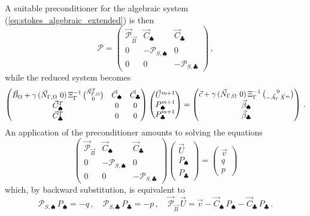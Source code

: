 A suitable preconditioner for the algebraic system
(\ref{eq:stokes_algebraic_extended}) is then
\begin{equation} \label{eq:ESW_extended}
\mathcal{P} = \begin{pmatrix}
\vec{\mathcal{P}}_{\vec B} & \vec C_\spadesuit & \vec C_\clubsuit \\
0 & -\mathcal{P}_{S,\spadesuit} & 0 \\
0 & 0 &-\mathcal{P}_{S,\clubsuit}
\end{pmatrix}\,,
\end{equation}
while the reduced system becomes
\begin{subequations}
\begin{equation} \label{eq:SchurkX_extended}
\begin{pmatrix}
\vec B_\Omega + \gamma\,(\Nbulk \ 0)\,\Xi_\Gamma^{-1}\,\binom{\NbulkT}{0} &
\vec C_\spadesuit & \vec C_\clubsuit \\
\vec C^T_\spadesuit & 0 & 0 \\
\vec C^T_\clubsuit & 0 & 0 \\
\end{pmatrix}
\begin{pmatrix}
\vec U^{m+1} \\
P^{m+1}_\spadesuit \\
P^{m+1}_\clubsuit
\end{pmatrix}
= \begin{pmatrix}
\vec c+\gamma\,(\Nbulk \ 0)\,
\Xi_\Gamma^{-1}\,\binom{0}{-\vec A_\Gamma\,\vec X^m} \\
\vec \beta_\spadesuit \\
\vec \beta_\clubsuit
\end{pmatrix}\,.
\end{equation}
\end{subequations}
An application of the preconditioner amounts to solving the equations
\begin{equation*}
\begin{pmatrix}
\vec{\mathcal{P}}_{\vec B} & \vec C_\spadesuit & \vec C_\clubsuit \\
0 & -\mathcal{P}_{S,\spadesuit} & 0 \\
0 & 0 &-\mathcal{P}_{S,\clubsuit}
\end{pmatrix}
\begin{pmatrix}
\vec U \\
P_\spadesuit \\
P_\clubsuit
\end{pmatrix}
=
\begin{pmatrix}
\vec v \\
q \\
p
\end{pmatrix}
\end{equation*}
which, by backward substitution, is equivalent to
\begin{equation}\label{eq:blocksolution_extended}
\mathcal{P}_{S,\spadesuit}\,P_\spadesuit =
-q\,,\quad \mathcal{P}_{S,\clubsuit}\,P_\clubsuit =
-p\,,\quad \vec{\mathcal{P}}_{\vec B}\,\vec U =
\vec v - \vec C_\spadesuit\,P_\spadesuit - \vec C_\clubsuit\,P_\clubsuit\,.
\end{equation}

